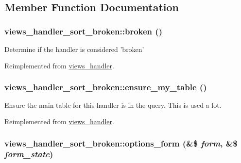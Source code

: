\subsection{Member Function Documentation}
\hypertarget{classviews__handler__sort__broken_082f810e9181d6b2f878013897e3cc17}{
\subsubsection[{broken}]{\setlength{\rightskip}{0pt plus 5cm}views\_\-handler\_\-sort\_\-broken::broken ()}}
\label{classviews__handler__sort__broken_082f810e9181d6b2f878013897e3cc17}


Determine if the handler is considered 'broken' 

Reimplemented from \hyperlink{classviews__handler_c1cd2ff30cb558c79cc908be516fb725}{views\_\-handler}.\hypertarget{classviews__handler__sort__broken_148e3b71f7327ed44a139ecefbd1d43b}{
\subsubsection[{ensure\_\-my\_\-table}]{\setlength{\rightskip}{0pt plus 5cm}views\_\-handler\_\-sort\_\-broken::ensure\_\-my\_\-table ()}}
\label{classviews__handler__sort__broken_148e3b71f7327ed44a139ecefbd1d43b}


Ensure the main table for this handler is in the query. This is used a lot. 

Reimplemented from \hyperlink{classviews__handler_947f21ef0f21a77f4d103af4702b3600}{views\_\-handler}.\hypertarget{classviews__handler__sort__broken_57d7f6176962083d4c17cbf448cb792f}{
\subsubsection[{options\_\-form}]{\setlength{\rightskip}{0pt plus 5cm}views\_\-handler\_\-sort\_\-broken::options\_\-form (\&\$ {\em form}, \/  \&\$ {\em form\_\-state})}}
\label{classviews__handler__sort__broken_57d7f6176962083d4c17cbf448cb792f}



